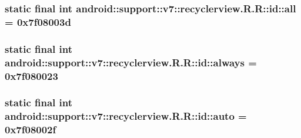 \hypertarget{classandroid_1_1support_1_1v7_1_1recyclerview_1_1_r_1_1id_530a54122af73781c89278a42a2d75cd}{
\subsubsection[{all}]{\setlength{\rightskip}{0pt plus 5cm}static final int android::support::v7::recyclerview.R.R::id::all = 0x7f08003d}}
\label{classandroid_1_1support_1_1v7_1_1recyclerview_1_1_r_1_1id_530a54122af73781c89278a42a2d75cd}


\hypertarget{classandroid_1_1support_1_1v7_1_1recyclerview_1_1_r_1_1id_8de08c557dcbf25f6caf69644096214b}{
\subsubsection[{always}]{\setlength{\rightskip}{0pt plus 5cm}static final int android::support::v7::recyclerview.R.R::id::always = 0x7f080023}}
\label{classandroid_1_1support_1_1v7_1_1recyclerview_1_1_r_1_1id_8de08c557dcbf25f6caf69644096214b}


\hypertarget{classandroid_1_1support_1_1v7_1_1recyclerview_1_1_r_1_1id_1ce335ab919aac4ee1ffecdb12a32265}{
\subsubsection[{auto}]{\setlength{\rightskip}{0pt plus 5cm}static final int android::support::v7::recyclerview.R.R::id::auto = 0x7f08002f}}
\label{classandroid_1_1support_1_1v7_1_1recyclerview_1_1_r_1_1id_1ce335ab919aac4ee1ffecdb12a32265}


